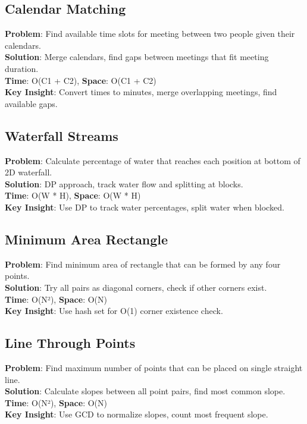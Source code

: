 \documentclass{report}
\begin{document}
\subsection{Calendar Matching}
\textbf{Problem}: Find available time slots for meeting between two people given their calendars.\\
\textbf{Solution}: Merge calendars, find gaps between meetings that fit meeting duration.\\
\textbf{Time}: O(C1 + C2), \textbf{Space}: O(C1 + C2)\\
\textbf{Key Insight}: Convert times to minutes, merge overlapping meetings, find available gaps.

\subsection{Waterfall Streams}
\textbf{Problem}: Calculate percentage of water that reaches each position at bottom of 2D waterfall.\\
\textbf{Solution}: DP approach, track water flow and splitting at blocks.\\
\textbf{Time}: O(W * H), \textbf{Space}: O(W * H)\\
\textbf{Key Insight}: Use DP to track water percentages, split water when blocked.

\subsection{Minimum Area Rectangle}
\textbf{Problem}: Find minimum area of rectangle that can be formed by any four points.\\
\textbf{Solution}: Try all pairs as diagonal corners, check if other corners exist.\\
\textbf{Time}: O(N²), \textbf{Space}: O(N)\\
\textbf{Key Insight}: Use hash set for O(1) corner existence check.

\subsection{Line Through Points}
\textbf{Problem}: Find maximum number of points that can be placed on single straight line.\\
\textbf{Solution}: Calculate slopes between all point pairs, find most common slope.\\
\textbf{Time}: O(N²), \textbf{Space}: O(N)\\
\textbf{Key Insight}: Use GCD to normalize slopes, count most frequent slope.
\end{document}
